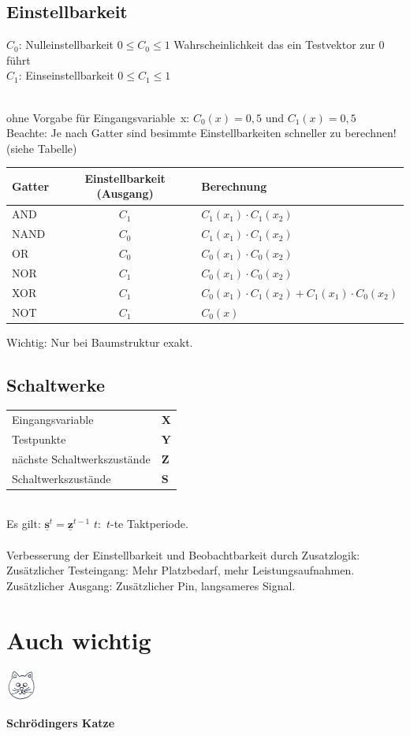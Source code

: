 \documentclass[6pt,a4paper]{scrartcl}
\newcommand{\utilde}[1]{#1}
\renewcommand{\emph}[1]{\textsf{\textbf{#1}}}
\renewcommand{\vec}[1]{\ensuremath{\underline{\boldsymbol {#1}}}}
\newcommand{\ma}[1]{\ensuremath{\utilde{\bs {#1}}}}
\newcommand{\bs}[1]{\ensuremath{\boldsymbol{#1}}}								%
\renewcommand{\vec}[1]{\ensuremath{\underline{\boldsymbol {#1}}}}
\begin{document}
\begin{multicols}{3}
	\subsection{Einstellbarkeit}
	\parbox{2.5cm}{  }
	\parbox{4.0cm}{
		$C_0$: Nulleinstellbarkeit $ 0 \le C_0 \le 1 $ Wahrscheinlichkeit das ein Testvektor zur 0 führt\\
		$C_1$: Einseinstellbarkeit $ 0 \le C_1 \le 1 $
	}\\
	ohne Vorgabe für Eingangsvariable~x: $C_0(x)=0,5$ und $C_1(x)=0,5$\\
	Beachte: Je nach Gatter sind besimmte Einstellbarkeiten schneller zu berechnen! (siehe Tabelle)\\
	\begin{tabular}{l|c|l}
	Gatter & Einstellbarkeit (Ausgang) & Berechnung\\ \midrule
	AND & $C_1$ & $C_1(x_1) \cdot C_1(x_2)$ \\
	NAND & $ C_0$ & $C_1(x_1) \cdot C_1(x_2)$ \\
	OR & $C_0$ & $C_0(x_1) \cdot C_0(x_2)$ \\
	NOR & $C_1$ & $C_0(x_1) \cdot C_0(x_2)$ \\
	XOR & $C_1$ & $C_0(x_1) \cdot C_1(x_2) + C_1(x_1) \cdot C_0(x_2)$ \\
	NOT & $C_1$ & $C_0(x)$ \\
	\end{tabular}
	\newline Wichtig: Nur bei Baumstruktur exakt.\\

	\subsection{Schaltwerke}
	\begin{tabular}{ll}
		Eingangsvariable 			& 		$\ma X$	\\
		Testpunkte 					& 		$\ma Y$	\\
		nächste Schaltwerkszustände & 		$\ma Z$	\\
		Schaltwerkszustände 		&		$\ma S$	\\
	\end{tabular}									\\
	
	Es gilt: $\vec s^t = \vec z^{t-1}$ \qquad $t:$ $t$-te Taktperiode.\\
	\\
	Verbesserung der Einstellbarkeit und Beobachtbarkeit durch Zusatzlogik:\\
	Zusätzlicher Testeingang: Mehr Platzbedarf, mehr Leistungsaufnahmen.\\
	Zusätzlicher Ausgang: Zusätzlicher Pin, langsameres Signal.\\
	
\section{Auch wichtig}
\parbox{1.2cm}{
 \includegraphics[width=1cm]{img/cat.jpg}
 }
 \parbox{3cm}{
\emph{Schrödingers Katze}
}
\end{multicols}


\end{document}
